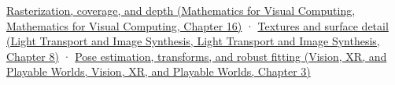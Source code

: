 \href{../02-Mathematics-for-Visual-Computing/main.pdf\#nameddest=03-visual-computing-i-ch012-rasterization-coverage-and-depth}{Rasterization, coverage, and depth (Mathematics for Visual Computing, Mathematics for Visual Computing, Chapter 16)} · \href{../04-Light-Transport-and-Image-Synthesis/main.pdf\#nameddest=03-visual-computing-i-ch019-textures-and-surface-detail}{Textures and surface detail (Light Transport and Image Synthesis, Light Transport and Image Synthesis, Chapter 8)} · \href{../07-Vision-XR-and-Playable-Worlds/main.pdf\#nameddest=04-visual-computing-ii-ch032-pose-estimation-transforms-and-robust-fitting}{Pose estimation, transforms, and robust fitting (Vision, XR, and Playable Worlds, Vision, XR, and Playable Worlds, Chapter 3)}
